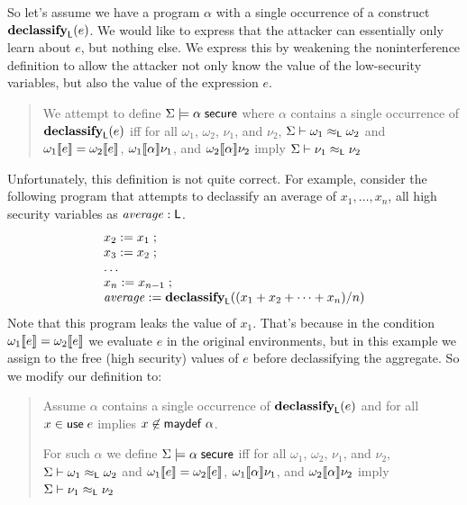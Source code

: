 \documentclass[11pt]{article}
\begin{document}
So let's assume we have a program $\alpha$ with a single occurrence of
a construct $\mathbf{declassify}_{\mathsf{L}}(e)$.  We would like to express that
the attacker can essentially only learn about $e$, but nothing else.
We express this by weakening the noninterference definition to allow
the attacker not only know the value of the low-security variables,
but also the value of the expression $e$.
\begin{quote}
  We {\color{red}attempt} to define $\Sigma \models \alpha\; \mathsf{secure}$ where
  $\alpha$ contains a single occurrence of $\mathbf{declassify}_{\mathsf{L}}(e)$
  iff for all $\omega_1$, $\omega_2$, $\nu_1$, and $\nu_2$, \newline
  $\Sigma \vdash \omega_1 \approx_{\mathsf{L}} \omega_2$ and
  $\omega_1 \llbracket e \rrbracket = \omega_2 \llbracket e \rrbracket$, \newline
  $\omega_1 \llbracket \alpha \rrbracket \nu_1$, and $\omega_2 \llbracket \alpha \rrbracket \nu_2$
  imply
  $\Sigma \vdash \nu_1 \approx_{\mathsf{L}} \nu_2$
\end{quote}
Unfortunately, this definition is not quite correct.  For example, consider
the following program that attempts to declassify an average of $x_1, \ldots, x_n$,
all high security variables as $\mathit{average} : \mathsf{L}$.
\[
  \begin{array}{l}
    x_2 := x_1 \mathrel{;} \\
    x_3 := x_2 \mathrel{;} \\
    \ldots \\
    x_n := x_{n-1} \mathrel{;} \\
    \mathit{average} := \mathbf{declassify}_{\mathsf{L}}((x_1 + x_2 + \cdots + x_n)/n)
  \end{array}
\]
Note that this program leaks the value of $x_1$.  That's because in the
condition $\omega_1 \llbracket e \rrbracket = \omega_2 \llbracket e \rrbracket$ we evaluate $e$ in the
original environments, but in this example we assign to the free (high security)
values of $e$ before declassifying the aggregate.  So we modify our definition
to:
\begin{quote}
  Assume $\alpha$ contains a single occurrence of $\mathbf{declassify}_{\mathsf{L}}(e)$
  and for all $x \in \mathsf{use}\; e$ implies $x \not\in \mathsf{maydef}\; \alpha$.
  \par\medskip\noindent
  For such $\alpha$ we define $\Sigma \models \alpha\; \mathsf{secure}$ iff
  for all $\omega_1$, $\omega_2$, $\nu_1$, and $\nu_2$, \newline
  $\Sigma \vdash \omega_1 \approx_{\mathsf{L}} \omega_2$ and
  $\omega_1 \llbracket e \rrbracket = \omega_2 \llbracket e \rrbracket$, \newline
  $\omega_1 \llbracket \alpha \rrbracket \nu_1$, and $\omega_2 \llbracket \alpha \rrbracket \nu_2$
  imply
  $\Sigma \vdash \nu_1 \approx_{\mathsf{L}} \nu_2$
\end{quote}
\end{document}
